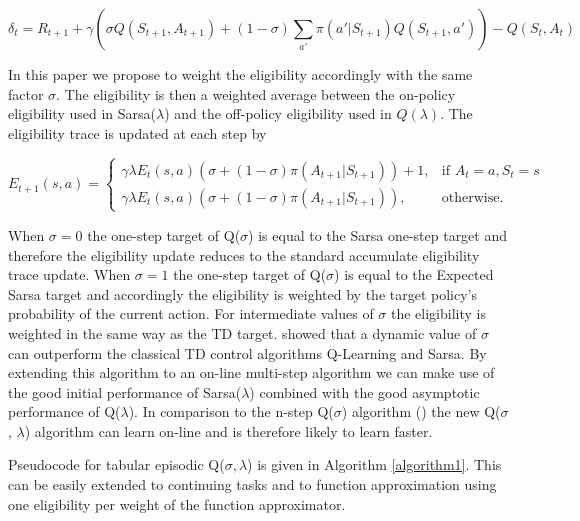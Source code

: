 \documentclass{article} %
\begin{document}
\begin{equation} 
\delta_t = R_{t+1} + \gamma ( \sigma Q(S_{t+1}, A_{t+1}) +  (1 - \sigma) \sum_{a'} \pi(a' | S_{t+1}) Q(S_{t+1}, a') ) - Q(S_t, A_t)
\end{equation}

In this paper we propose to weight the eligibility accordingly with the same factor $\sigma$. The eligibility is then a weighted average between the on-policy eligibility used in Sarsa($\lambda$) and the off-policy eligibility used in $Q(\lambda)$. The eligibility trace is updated at each step by

\begin{equation}
    E_{t+1}(s, a) =
\begin{cases}
    \gamma \lambda E_t(s, a) (\sigma + (1 - \sigma) \pi(A_{t+1} | S_{t+1})) + 1, & \text{if } A_t = a, S_t = s\\
    \gamma \lambda E_t(s, a) (\sigma + (1 - \sigma) \pi(A_{t+1} | S_{t+1})),    & \text{otherwise.}
\end{cases}
\end{equation}

When $\sigma = 0$ the one-step target of Q($\sigma$) is equal to the Sarsa one-step target and therefore the eligibility update reduces to the standard accumulate eligibility trace update. When $\sigma = 1$ the one-step target of Q($\sigma$) is equal to the Expected Sarsa target and accordingly the eligibility is weighted by the target policy's probability of the current action. For intermediate values of $\sigma$ the eligibility is weighted in the same way as the TD target. \cite{deasis2017} showed that a dynamic value of $\sigma$ can outperform the classical TD control algorithms Q-Learning and Sarsa. By extending this algorithm to an on-line multi-step algorithm we can make use of the good initial performance of Sarsa($\lambda$) combined with the good asymptotic performance of Q($\lambda$). In comparison to the n-step Q($\sigma$) algorithm (\cite{deasis2017}) the new Q($\sigma$, $\lambda$) algorithm can learn on-line and is therefore likely to learn faster. 

Pseudocode for tabular episodic Q($\sigma, \lambda$) is given in Algorithm \ref{algorithm1}. This can be easily extended to continuing tasks and to function approximation using one eligibility per weight of the function approximator.
\end{document}
